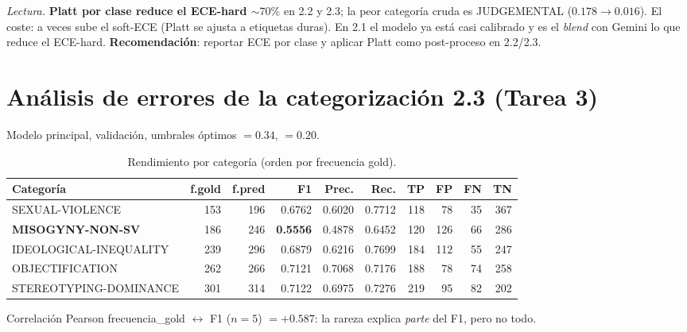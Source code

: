 \documentclass[11pt,a4paper]{article}
\newcommand{\best}[1]{\textbf{#1}}
\newcommand{\code}[1]{\texttt{\detokenize{#1}}}
\begin{document}
\noindent\emph{Lectura.} \textbf{Platt por clase reduce el ECE-hard $\sim70\%$} en 2.2 y 2.3; la
peor categoría cruda es JUDGEMENTAL ($0.178\rightarrow0.016$). El coste: a veces sube el soft-ECE
(Platt se ajusta a etiquetas duras). En 2.1 el modelo ya está casi calibrado y es el \emph{blend}
con Gemini lo que reduce el ECE-hard. \textbf{Recomendación}: reportar ECE por clase y aplicar
Platt como post-proceso en 2.2/2.3.

\section{Análisis de errores de la categorización 2.3 (Tarea 3)}

Modelo principal, validación, umbrales óptimos \code{thr_sex}$=0.34$, \code{thr_cat}$=0.20$.

\begin{table}[h]\centering\small
\caption{Rendimiento por categoría (orden por frecuencia gold).}
\setlength\tabcolsep{4.5pt}
\begin{tabular}{@{}lrrrrrrrrr@{}}
\toprule
Categoría & f.gold & f.pred & F1 & Prec. & Rec. & TP & FP & FN & TN \\
\midrule
SEXUAL-VIOLENCE              & 153 & 196 & 0.6762 & 0.6020 & 0.7712 & 118 & 78 & 35 & 367 \\
\best{MISOGYNY-NON-SV}       & 186 & 246 & \best{0.5556} & 0.4878 & 0.6452 & 120 & 126 & 66 & 286 \\
IDEOLOGICAL-INEQUALITY       & 239 & 296 & 0.6879 & 0.6216 & 0.7699 & 184 & 112 & 55 & 247 \\
OBJECTIFICATION              & 262 & 266 & 0.7121 & 0.7068 & 0.7176 & 188 & 78 & 74 & 258 \\
STEREOTYPING-DOMINANCE       & 301 & 314 & 0.7122 & 0.6975 & 0.7276 & 219 & 95 & 82 & 202 \\
\bottomrule
\end{tabular}
\end{table}

\noindent Correlación Pearson frecuencia\_gold $\leftrightarrow$ F1 ($n=5$) $=+0.587$: la rareza
explica \emph{parte} del F1, pero no todo.
\end{document}
